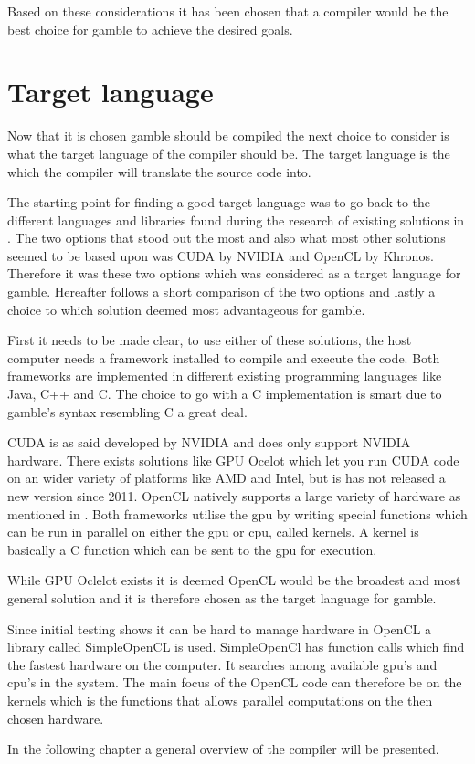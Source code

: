 Based on these considerations it has been chosen that a compiler would be the best choice for \gls{gamble} to achieve the desired goals.

\section{Target language}
Now that it is chosen \gls{gamble} should be compiled the next choice to consider is what the target language of the compiler should be.
The target language is the which the compiler will translate the source code into.

The starting point for finding a good target language was to go back to the different languages and libraries found during the research of existing solutions in .
The two options that stood out the most and also what most other solutions seemed to be based upon was CUDA by NVIDIA and OpenCL by Khronos.
Therefore it was these two options which was considered as a target language for \gls{gamble}.
Hereafter follows a short comparison of the two options and lastly a choice to which solution deemed most advantageous for \gls{gamble}.

First it needs to be made clear, to use either of these solutions, the host computer needs a framework installed to compile and execute the code.
Both frameworks are implemented in different existing programming languages like Java, C++ and C.
The choice to go with a C implementation is smart due to \gls{gamble}'s syntax resembling C a great deal.

CUDA is as said developed by NVIDIA and does only support NVIDIA hardware.
There exists solutions like GPU Ocelot which let you run CUDA code on an wider variety of platforms like AMD and Intel, but is has  not released a new version since 2011.\citep{Diamos:2010:ODO:1854273.1854318}
OpenCL natively supports a large variety of hardware as mentioned in .
Both frameworks utilise the \gls{gpu} by writing special functions which can be run in parallel on either the \gls{gpu} or \gls{cpu}, called kernels.
A kernel is basically a C function which can be sent to the \acrshort{gpu} for execution.

While GPU Oclelot exists it is deemed OpenCL would be the broadest and most general solution and it is therefore chosen as the target language for \gls{gamble}.

Since initial testing shows it can be hard to manage hardware in OpenCL a library called SimpleOpenCL is used.
SimpleOpenCl has function calls which find the fastest hardware on the computer.
It searches among available \gls{gpu}'s and \gls{cpu}'s in the system.\citep{simpecl}
The main focus of the OpenCL code can therefore be on the kernels which is the functions that allows parallel computations on the then chosen hardware.

In the following chapter a general overview of the compiler will be presented.
